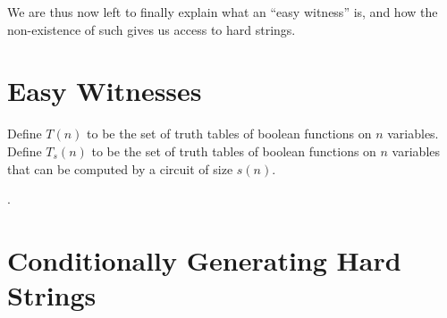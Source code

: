We are thus now left to finally explain what an ``easy witness'' is, and how 
the non-existence of such gives us access to hard strings.

\section{Easy Witnesses}

\begin{definition}
  Define \emph{$T(n)$} to be the set of truth tables of boolean functions on 
  $n$ variables.
  Define \emph{$T_s(n)$} to be the set of truth tables of boolean functions on 
  $n$ variables that can be computed by a circuit of size $s(n)$.
\end{definition}

.

\section{Conditionally Generating Hard Strings}

